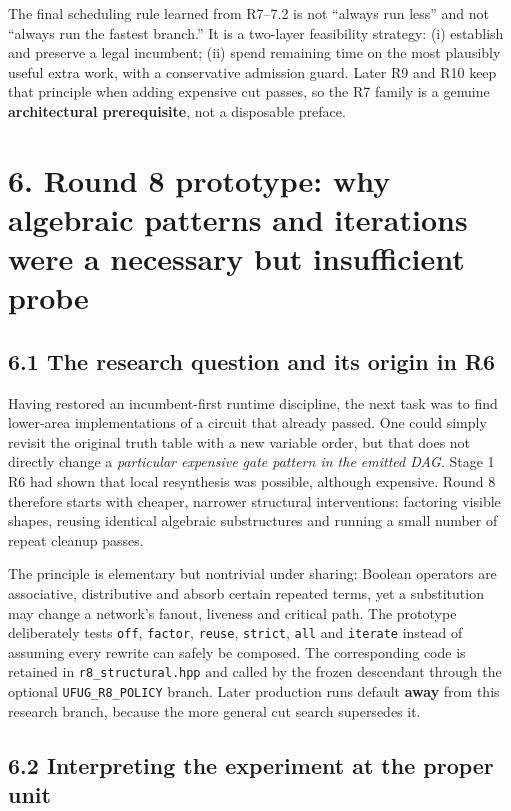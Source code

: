 The final scheduling rule learned from R7--7.2 is not ``always run less'' and not ``always run the fastest branch.'' It is a two-layer feasibility strategy: (i) establish and preserve a legal incumbent; (ii) spend remaining time on the most plausibly useful extra work, with a conservative admission guard. Later R9 and R10 keep that principle when adding expensive cut passes, so the R7 family is a genuine \textbf{architectural prerequisite}, not a disposable preface.

\section{6. Round 8 prototype: why algebraic patterns and iterations were a necessary but insufficient probe}\label{round-8-prototype-why-algebraic-patterns-and-iterations-were-a-necessary-but-insufficient-probe}

\subsection{6.1 The research question and its origin in R6}\label{the-research-question-and-its-origin-in-r6}

Having restored an incumbent-first runtime discipline, the next task was to find lower-area implementations of a circuit that already passed. One could simply revisit the original truth table with a new variable order, but that does not directly change a \emph{particular expensive gate pattern in the emitted DAG}. Stage 1 R6 had shown that local resynthesis was possible, although expensive. Round 8 therefore starts with cheaper, narrower structural interventions: factoring visible shapes, reusing identical algebraic substructures and running a small number of repeat cleanup passes.

The principle is elementary but nontrivial under sharing: Boolean operators are associative, distributive and absorb certain repeated terms, yet a substitution may change a network's fanout, liveness and critical path. The prototype deliberately tests \texttt{off}, \texttt{factor}, \texttt{reuse}, \texttt{strict}, \texttt{all} and \texttt{iterate} instead of assuming every rewrite can safely be composed. The corresponding code is retained in \texttt{r8\_structural.hpp} and called by the frozen descendant through the optional \texttt{UFUG\_R8\_POLICY} branch. Later production runs default \textbf{away} from this research branch, because the more general cut search supersedes it.

\subsection{6.2 Interpreting the experiment at the proper unit}\label{interpreting-the-experiment-at-the-proper-unit}


